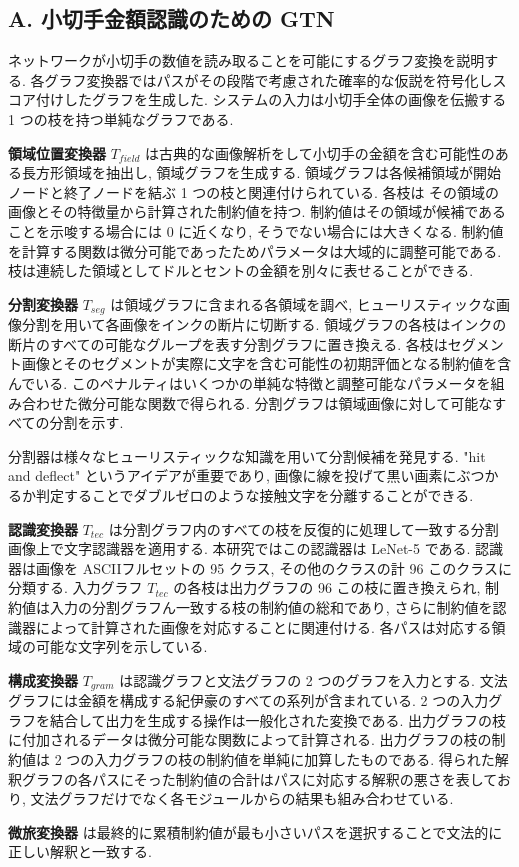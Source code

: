 \documentclass[twocolumn]{jarticle}     %
\begin{document}
\subsection*{A. 小切手金額認識のための GTN}
ネットワークが小切手の数値を読み取ることを可能にするグラフ変換を説明する. 
各グラフ変換器ではパスがその段階で考慮された確率的な仮説を符号化しスコア付けしたグラフを生成した. 
システムの入力は小切手全体の画像を伝搬する 1 つの枝を持つ単純なグラフである. 
\par
\textbf{領域位置変換器} $T_{field}$ は古典的な画像解析をして小切手の金額を含む可能性のある長方形領域を抽出し, 領域グラフを生成する. 領域グラフは各候補領域が開始ノードと終了ノードを結ぶ 1 つの枝と関連付けられている. 各枝は
その領域の画像とその特徴量から計算された制約値を持つ. 制約値はその領域が候補であることを示唆する場合には 0 に近くなり, そうでない場合には大きくなる. 制約値を計算する関数は微分可能であったためパラメータは大域的に調整可能である. 
枝は連続した領域としてドルとセントの金額を別々に表せることができる.
\par
\textbf{分割変換器} $T_{seg}$ は領域グラフに含まれる各領域を調べ, ヒューリスティックな画像分割を用いて各画像をインクの断片に切断する. 領域グラフの各枝はインクの断片のすべての可能なグループを表す分割グラフに置き換える. 各枝はセグメント画像とそのセグメントが実際に文字を含む可能性の初期評価となる制約値を含んでいる.
このペナルティはいくつかの単純な特徴と調整可能なパラメータを組み合わせた微分可能な関数で得られる. 分割グラフは領域画像に対して可能なすべての分割を示す.\par
分割器は様々なヒューリスティックな知識を用いて分割候補を発見する. "hit and deflect" というアイデアが重要であり, 画像に線を投げて黒い画素にぶつかるか判定することでダブルゼロのような接触文字を分離することができる. 
\par
\textbf{認識変換器} $T_{tec}$ は分割グラフ内のすべての枝を反復的に処理して一致する分割画像上で文字認識器を適用する. 
本研究ではこの認識器は LeNet-5 である. 
認識器は画像を ASCIIフルセットの 95 クラス, その他のクラスの計 96 このクラスに分類する. 入力グラフ $T_{tec}$ の各枝は出力グラフの 96 この枝に置き換えられ, 制約値は入力の分割グラフん一致する枝の制約値の総和であり, さらに制約値を認識器によって計算された画像を対応することに関連付ける. 各パスは対応する領域の可能な文字列を示している. 
\par
\textbf{構成変換器} $T_{gram}$ は認識グラフと文法グラフの 2 つのグラフを入力とする. 文法グラフには金額を構成する紀伊豪のすべての系列が含まれている. 2 つの入力グラフを結合して出力を生成する操作は一般化された変換である. 出力グラフの枝に付加されるデータは微分可能な関数によって計算される. 出力グラフの枝の制約値は 2 つの入力グラフの枝の制約値を単純に加算したものである. 得られた解釈グラフの各パスにそった制約値の合計はパスに対応する解釈の悪さを表しており, 文法グラフだけでなく各モジュールからの結果も組み合わせている. 
\par
\textbf{微旅変換器} は最終的に累積制約値が最も小さいパスを選択することで文法的に正しい解釈と一致する. 
\end{document}
